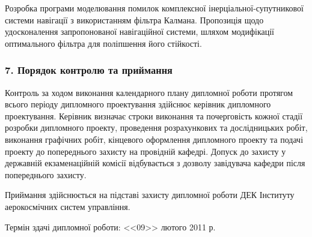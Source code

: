 Розробка програми моделювання помилок комплексної 
інерціальної-супутникової системи навігації з використанням 
фільтра Калмана. Пропозиція щодо удосконалення запропонованої 
навігаційної системи, шляхом модифікації оптимального фільтра 
для поліпшення його стійкості.

\subsubsection*{7. Порядок контролю та приймання}
Контроль за ходом виконання календарного плану дипломної роботи протягом 
всього періоду дипломного проектування здійснює керівник дипломного 
проектування. Керівник визначає строки виконання та почерговість кожної 
стадії розробки дипломного проекту, проведення розрахункових та 
дослідницьких робіт, виконання графічних робіт, кінцевого оформлення 
дипломного проекту та подачі проекту до попереднього захисту  на провідній 
кафедрі. Допуск до захисту у державній екзаменаційній комісії відбувається 
з дозволу завідувача кафедри після попереднього захисту.
% 

Приймання здійснюється на підставі захисту дипломної роботи ДЕК Інституту 
аерокосмічних систем управління.

Термін здачі дипломної роботи: <<09>> лютого 2011 р.

% 
